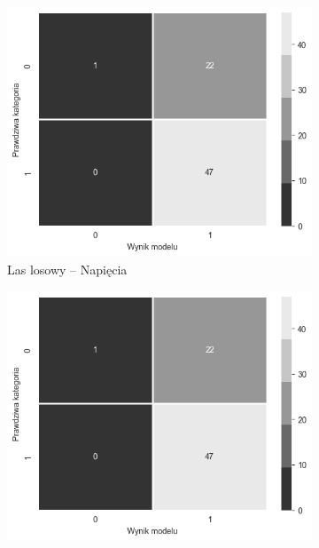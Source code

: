 \documentclass{./assets/wfis}
\begin{document}
\begin{figure}[h!]
    \centering
    \begin{subfigure}[b]{0.45\textwidth}
        \centering
        \includegraphics[width=\columnwidth]{thesis/assets/confusion_matrix_placeholder.png}
        \caption{Las losowy – Napięcia}
        \label{fig:computer-time}
    \end{subfigure}   
    \hfill
    \begin{subfigure}[b]{0.45\textwidth}
        \centering
        \includegraphics[width=\columnwidth]{thesis/assets/confusion_matrix_placeholder.png}

\end{subfigure}
\end{figure}
\end{document}
